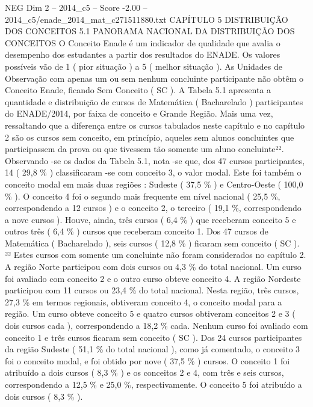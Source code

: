 \begin{textsample}{NEG Dim 2 – 2014\_c5 – Score -2.00 – 2014\_c5/enade\_2014\_mat\_c271511880.txt}  \label{ex:f2_neg_124}
CAPÍTULO 5 DISTRIBUIÇÃO DOS CONCEITOS 5.1 PANORAMA NACIONAL DA DISTRIBUIÇÃO DOS CONCEITOS O Conceito Enade é um indicador de qualidade que avalia o desempenho dos estudantes a partir dos resultados do ENADE.
Os valores possíveis vão de 1 ( pior situação ) a 5 ( melhor situação ).
As Unidades de Observação com apenas um ou sem nenhum concluinte participante não obtêm o Conceito Enade, ficando Sem Conceito ( SC ).
A Tabela 5.1 apresenta a quantidade e distribuição de cursos de Matemática ( Bacharelado ) participantes do ENADE/2014, por faixa de conceito e Grande Região.
Mais uma vez, ressaltando que a diferença entre os cursos tabulados neste capítulo e no capítulo 2 são os cursos sem conceito, em princípio, aqueles sem alunos concluintes que participassem da prova ou que tivessem tão somente um aluno concluinte²².
Observando -se os dados da Tabela 5.1, nota -se que, dos 47 cursos participantes, 14 ( 29,8 \% ) classificaram -se com conceito 3, o valor modal.
Este foi também o conceito modal em mais duas regiões : Sudeste ( 37,5 \% ) e Centro-Oeste ( 100,0 \% ).
O conceito 4 foi o segundo mais frequente em nível nacional ( 25,5 \%, correspondendo a 12 cursos ) e o conceito 2, o terceiro ( 19,1 \%, correspondendo a nove cursos ).
Houve, ainda, três cursos ( 6,4 \% ) que receberam conceito 5 e outros três ( 6,4 \% ) cursos que receberam conceito 1.
Dos 47 cursos de Matemática ( Bacharelado ), seis cursos ( 12,8 \% ) ficaram sem conceito ( SC ). ²² Estes cursos com somente um concluinte não foram considerados no capítulo 2.
A região Norte participou com dois cursos ou 4,3 \% do total nacional.
Um curso foi avaliado com conceito 2 e o outro curso obteve conceito 4.
A região Nordeste participou com 11 cursos ou 23,4 \% do total nacional.
Nesta região, três cursos, 27,3 \% em termos regionais, obtiveram conceito 4, o conceito modal para a região.
Um curso obteve conceito 5 e quatro cursos obtiveram conceitos 2 e 3 ( dois cursos cada ), correspondendo a 18,2 \% cada.
Nenhum curso foi avaliado com conceito 1 e três cursos ficaram sem conceito ( SC ).
Dos 24 cursos participantes da região Sudeste ( 51,1 \% do total nacional ), como já comentado, o conceito 3 foi o conceito modal, e foi obtido por nove ( 37,5 \% ) cursos.
O conceito 1 foi atribuído a dois cursos ( 8,3 \% ) e os conceitos 2 e 4, com três e seis cursos, correspondendo a 12,5 \% e 25,0 \%, respectivamente.
O conceito 5 foi atribuído a dois cursos ( 8,3 \% ).

\end{textsample}
